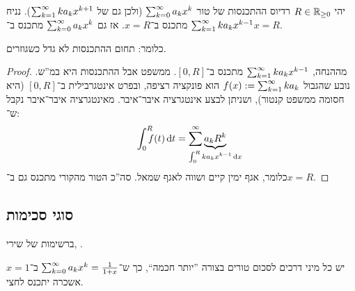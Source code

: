 \documentclass[]{../../../../tex/classes/styledArticle}
\begin{document}
	\begin{Theorem}
		יהי $R \in \mathbb{R}_{\ge 0}$ רדיוס ההתכנסות של טור $\sum_{k = 0}^{\infty} a_kx^{k}$ (ולכן גם של $\sum_{k = 1}^{\infty} ka_kx^{k + 1}$). נניח $\sum_{k = 1}^{\infty} ka_kx^{k - 1}$ מתכנס ב־$x = R$. אז גם $\sum_{k = 0}^{\infty} a_kx^{k}$ מתכנס ב־$x =R$. 
	\end{Theorem}
	כלומר: תחום ההתכנסות לא גדל כשגוזרים. 
	\begin{proof}
		מההנחה, $\sum_{k = 1}^{\infty} ka_kx^{k - 1}$ מתכנס ב־$[0, R]$. ממשפט אבל ההתכנסות היא במ''ש. נובע שהגבול $f(x) := \sum_{k = 1}^{\infty} ka_k$ הוא פונקציה רציפה, ובפרט אינטגרבילית ב־$[0, R]$ (היא חסומה ממשפט קנטור), ושניתן לבצע אינטגרציה איבר־איבר. מאינטגרציה איבר־איבר נקבל ש־: 
		\[ \int^{R}_0 \dequad \ f(t)\dt = \sum^{\infty} \underbrace{a_kR^{k}}_{\mathclap{\int^{R}_0 ka_kx^{k - 1}\dx}} \]
		כלומר, אגף ימין קיים ושווה לאגף שמאל. סה''כ הטור מהקורי מתכנס גם ב־$x = R$. 
	\end{proof}
	
	\subsection*{סוגי סכימות}
	ברשימות של שירי, . 
	
	יש כל מיני דרכים לסכום טורים בצורה ''יותר חכמה``, כך ש־$\sum_{k = 0}^{\infty} a_kx^{k} = \frac{1}{1 + x}$ ב־$x = 1$ אשכרה יתכנס לחצי. 
	
	
	
	
	
	
	\ndoc
\end{document}
